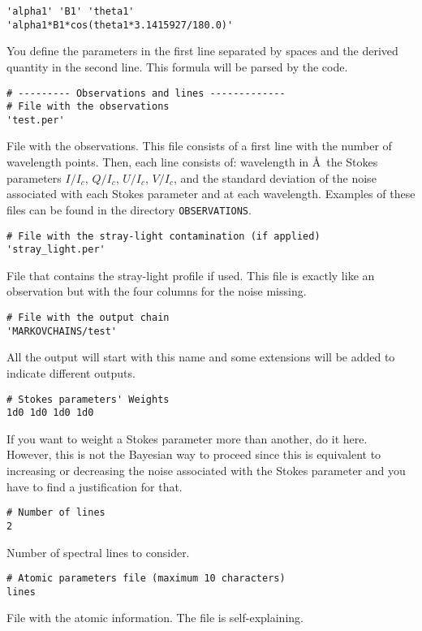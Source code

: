 \documentclass[12pt]{article}
\begin{document}
\begin{verbatim}
'alpha1' 'B1' 'theta1'
'alpha1*B1*cos(theta1*3.1415927/180.0)'
\end{verbatim}
You define the parameters in the first line separated by spaces
and the derived quantity in the second line. This formula will
be parsed by the code.

\begin{verbatim}
# --------- Observations and lines -------------
# File with the observations
'test.per'
\end{verbatim}
File with the observations. This file consists of a first line with the number of
wavelength points. Then, each line consists of: wavelength in \AA\, the Stokes
parameters $I/I_c$, $Q/I_c$, $U/I_c$, $V/I_c$, and the standard deviation of the
noise associated with each Stokes parameter and at each wavelength. Examples of
these files can be found in the directory \texttt{OBSERVATIONS}.

\begin{verbatim}
# File with the stray-light contamination (if applied)
'stray_light.per'
\end{verbatim}
File that contains the stray-light profile if used. This file is exactly like an
observation but with the four columns for the noise missing.

\begin{verbatim}
# File with the output chain
'MARKOVCHAINS/test'
\end{verbatim}
All the output will start with this name and some extensions will be added to
indicate different outputs.

\begin{verbatim}
# Stokes parameters' Weights
1d0 1d0 1d0 1d0
\end{verbatim}
If you want to weight a Stokes parameter more than another, do it here. However,
this is not the Bayesian way to proceed since this is equivalent to increasing
or decreasing the noise associated with the Stokes parameter and you have
to find a justification for that.

\begin{verbatim}
# Number of lines
2
\end{verbatim}
Number of spectral lines to consider.

\begin{verbatim}
# Atomic parameters file (maximum 10 characters)        
lines
\end{verbatim}
File with the atomic information. The file is self-explaining.
\end{document}
